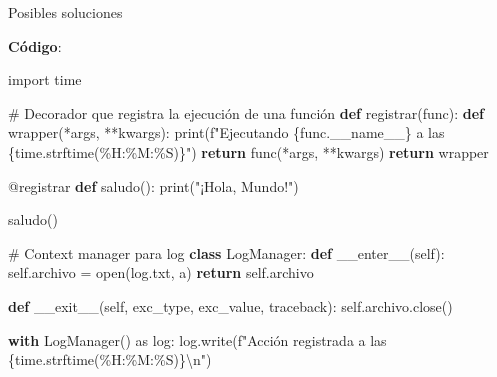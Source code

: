 \documentclass[
  a4paper,
  DIV=11,
  numbers=noendperiod,
  onepage,
  openany]{scrreprt}
\newenvironment{Shaded}{\begin{snugshade}}{\end{snugshade}}
\newcommand{\AttributeTok}[1]{\textcolor[rgb]{0.40,0.45,0.13}{#1}}
\newcommand{\BuiltInTok}[1]{\textcolor[rgb]{0.00,0.23,0.31}{#1}}
\newcommand{\CharTok}[1]{\textcolor[rgb]{0.13,0.47,0.30}{#1}}
\newcommand{\CommentTok}[1]{\textcolor[rgb]{0.37,0.37,0.37}{#1}}
\newcommand{\ControlFlowTok}[1]{\textcolor[rgb]{0.00,0.23,0.31}{\textbf{#1}}}
\newcommand{\FunctionTok}[1]{\textcolor[rgb]{0.28,0.35,0.67}{#1}}
\newcommand{\ImportTok}[1]{\textcolor[rgb]{0.00,0.46,0.62}{#1}}
\newcommand{\KeywordTok}[1]{\textcolor[rgb]{0.00,0.23,0.31}{\textbf{#1}}}
\newcommand{\NormalTok}[1]{\textcolor[rgb]{0.00,0.23,0.31}{#1}}
\newcommand{\OperatorTok}[1]{\textcolor[rgb]{0.37,0.37,0.37}{#1}}
\newcommand{\SpecialCharTok}[1]{\textcolor[rgb]{0.37,0.37,0.37}{#1}}
\newcommand{\SpecialStringTok}[1]{\textcolor[rgb]{0.13,0.47,0.30}{#1}}
\newcommand{\StringTok}[1]{\textcolor[rgb]{0.13,0.47,0.30}{#1}}
\newcommand{\VariableTok}[1]{\textcolor[rgb]{0.07,0.07,0.07}{#1}}
\begin{document}
Posibles soluciones

\textbf{Código}:

\begin{Shaded}
\begin{Highlighting}[]
\ImportTok{import}\NormalTok{ time}

\CommentTok{\# Decorador que registra la ejecución de una función}
\KeywordTok{def}\NormalTok{ registrar(func):}
    \KeywordTok{def}\NormalTok{ wrapper(}\OperatorTok{*}\NormalTok{args, }\OperatorTok{**}\NormalTok{kwargs):}
        \BuiltInTok{print}\NormalTok{(}\SpecialStringTok{f"Ejecutando }\SpecialCharTok{\{}\NormalTok{func}\SpecialCharTok{.}\VariableTok{\_\_name\_\_}\SpecialCharTok{\}}\SpecialStringTok{ a las }\SpecialCharTok{\{}\NormalTok{time}\SpecialCharTok{.}\NormalTok{strftime(}\StringTok{\textquotesingle{}\%H:\%M:\%S\textquotesingle{}}\NormalTok{)}\SpecialCharTok{\}}\SpecialStringTok{"}\NormalTok{)}
        \ControlFlowTok{return}\NormalTok{ func(}\OperatorTok{*}\NormalTok{args, }\OperatorTok{**}\NormalTok{kwargs)}
    \ControlFlowTok{return}\NormalTok{ wrapper}

\AttributeTok{@registrar}
\KeywordTok{def}\NormalTok{ saludo():}
    \BuiltInTok{print}\NormalTok{(}\StringTok{"¡Hola, Mundo!"}\NormalTok{)}

\NormalTok{saludo()}

\CommentTok{\# Context manager para log}
\KeywordTok{class}\NormalTok{ LogManager:}
    \KeywordTok{def} \FunctionTok{\_\_enter\_\_}\NormalTok{(}\VariableTok{self}\NormalTok{):}
        \VariableTok{self}\NormalTok{.archivo }\OperatorTok{=} \BuiltInTok{open}\NormalTok{(}\StringTok{\textquotesingle{}log.txt\textquotesingle{}}\NormalTok{, }\StringTok{\textquotesingle{}a\textquotesingle{}}\NormalTok{)}
        \ControlFlowTok{return} \VariableTok{self}\NormalTok{.archivo}

    \KeywordTok{def} \FunctionTok{\_\_exit\_\_}\NormalTok{(}\VariableTok{self}\NormalTok{, exc\_type, exc\_value, traceback):}
        \VariableTok{self}\NormalTok{.archivo.close()}

\ControlFlowTok{with}\NormalTok{ LogManager() }\ImportTok{as}\NormalTok{ log:}
\NormalTok{    log.write(}\SpecialStringTok{f"Acción registrada a las }\SpecialCharTok{\{}\NormalTok{time}\SpecialCharTok{.}\NormalTok{strftime(}\StringTok{\textquotesingle{}\%H:\%M:\%S\textquotesingle{}}\NormalTok{)}\SpecialCharTok{\}}\CharTok{\textbackslash{}n}\SpecialStringTok{"}\NormalTok{)}
\end{Highlighting}
\end{Shaded}
\end{document}
